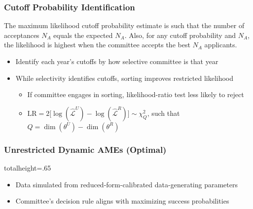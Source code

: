 \documentclass[12pt, aspectratio=169]{beamer}
\begin{document}
\begin{frame}[label=cpi]
\frametitle{Cutoff Probability Identification}
\begin{theorem}
The maximum likelihood cutoff probability estimate is such that the number of acceptances $N_A$ equals the expected $N_A$. Also, for any cutoff probability and $N_A$, \\ the likelihood is highest when the committee accepts the best $N_A$ applicants.
\end{theorem}
\vspace{5pt}
\begin{itemize}
\item Identify each year's cutoffs by how selective committee is that year
\vspace{10pt}
\item While selectivity identifies cutoffs, sorting improves restricted likelihood
\vspace{5pt}
\begin{itemize}
\item If committee engages in sorting, likelihood-ratio test less likely to reject
\vspace{5pt}
\item $\text{LR} = 2\big[\log(\hat{\mathcal L}^U)-\log(\hat{\mathcal L}^R)\big]\sim\chi_Q^2$, such that $Q=\dim(\theta^U)-\dim(\theta^R)$
\vspace{10pt}
\end{itemize}
\end{itemize}
\hyperlink{ec}{}
\end{frame}

\begin{frame}[label=ydueo]
\frametitle{Unrestricted Dynamic AMEs (Optimal)}
\vspace{-5pt}
\begin{table}[htbp]
  \centering
  \begin{adjustbox}{totalheight=.65\textheight}

  \end{adjustbox}
\end{table}%
\begin{itemize}
\item Data simulated from reduced-form-calibrated data-generating parameters
\vspace{1.25pt}
\item Committee's decision rule aligns with maximizing success probabilities
\vspace{1.25pt}
\end{itemize}
\hyperlink{ssso}{}
\hyperlink{fydueo}{}
\hyperlink{ysueo}{}
\end{frame}
\end{document}
